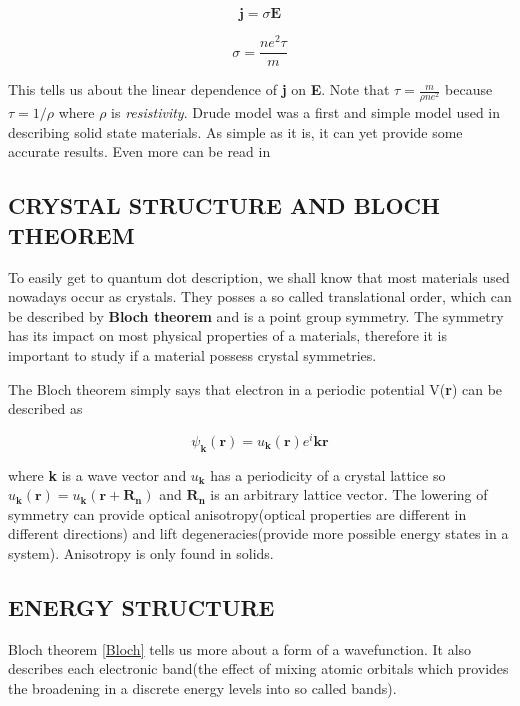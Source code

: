 \begin{equation}
\mathbf{j}=\sigma\mathbf{E}
\end{equation}

\begin{equation}
\sigma=\frac{ne^2\tau}{m}
\end{equation}

This tells us about the linear dependence of \textbf{j} on \textbf{E}. Note that $\tau = \frac{m}{\rho n e^{2}}$ because $\tau = 1/\rho$ where $\rho$ is \textit{resistivity}.
Drude model was a first and simple model used in describing solid state materials. As simple as it is, it can yet provide some accurate results. Even more can be read in \cite{Aschcroft}


\subsection{CRYSTAL STRUCTURE AND BLOCH THEOREM}

To easily get to quantum dot description, we shall know that most materials used nowadays occur as crystals. They posses a so called translational order, which can be described by \textbf{Bloch theorem} and is a point group symmetry. The symmetry has its impact on most physical properties of a materials, therefore it is important to study if a material possess crystal symmetries. 

The Bloch theorem simply says that electron in a periodic potential V(\textbf{r}) can be described as 

\begin{equation}
\psi _\mathbf{k} (\mathbf{r}) = u_\mathbf{k}(\mathbf{r})e^i\mathbf{k}\mathbf{r}
\label{Bloch}
\end{equation}

where \textbf{k} is a wave vector and $u_\mathbf{k}$ has a periodicity of a crystal lattice so $u_\mathbf{k}(\mathbf{r}) = u_\mathbf{k}(\mathbf{r+R_n})$ and $\mathbf{R_n}$ is an arbitrary lattice vector.
The lowering of symmetry can provide optical anisotropy(optical properties are different in different directions) and lift degeneracies(provide more possible energy states in a system). Anisotropy is only found in solids.

\subsection{ENERGY STRUCTURE}
Bloch theorem \ref{Bloch} tells us more about a form of a wavefunction. It also describes each electronic band(the effect of mixing atomic orbitals which provides the broadening in a discrete energy levels into so called bands). 

